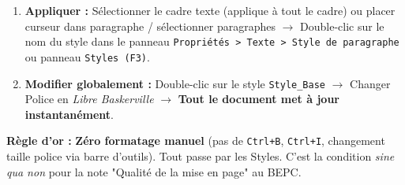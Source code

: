 \documentclass[11pt]{article}
\begin{document}
\begin{methode}
\begin{enumerate}
              \begin{itemize}
                  \item \texttt{Emphase} : Italique.
                  \item \texttt{GrasImportant} : Gras, Couleur \texttt{RougeAccent}.
                  \item \texttt{LienWeb} : Souligné, Bleu.
              \end{itemize}
        \item \textbf{Appliquer :} Sélectionner le cadre texte (applique à tout le cadre) ou placer curseur dans paragraphe / sélectionner paragraphes $\rightarrow$ Double-clic sur le nom du style dans le panneau \texttt{Propriétés > Texte > Style de paragraphe} ou panneau \texttt{Styles (F3)}.
        \item \textbf{Modifier globalement :} Double-clic sur le style \texttt{Style\_Base} $\rightarrow$ Changer Police en \textit{Libre Baskerville} $\rightarrow$ \textbf{Tout le document met à jour instantanément}.
    \end{enumerate}
    \textbf{Règle d'or :} \textbf{Zéro formatage manuel} (pas de \texttt{Ctrl+B}, \texttt{Ctrl+I}, changement taille police via barre d'outils). Tout passe par les Styles. C'est la condition \emph{sine qua non} pour la note "Qualité de la mise en page" au BEPC.
\end{methode}
\end{document}
